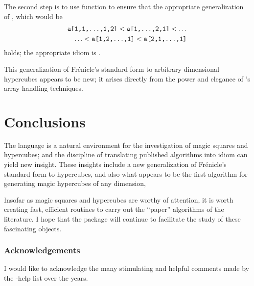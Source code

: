 \documentclass[nojss]{jss}
\begin{document}
The second step is to use function  to ensure that the
appropriate generalization of , which would be
\begin{eqnarray*}
\mbox{\texttt{a[1,1,...,1,2]}}<\mbox{\texttt{a[1,...,2,1]}}<\ldots\nonumber\\
\ldots<\mbox{\texttt{a[1,2,...,1]}}<\mbox{\texttt{a[2,1,...,1]}}
\end{eqnarray*}
holds; the appropriate  idiom is
.

This generalization of Fr\'{e}nicle's standard form to arbitrary
dimensional hypercubes appears to be new; it arises directly from the
power and elegance of 's array handling techniques.

\section{Conclusions}

The  language is a natural environment for the investigation of
magic squares and hypercubes; and the discipline of translating
published algorithms into  idiom can yield new insight.  These
insights include a new generalization of Fr\'{e}nicle's standard form
to hypercubes, and also what appears to be the first algorithm for
generating magic hypercubes of any dimension,

Insofar as magic squares and hypercubes are worthy of attention, it is
worth creating fast, efficient routines to carry out the ``paper''
algorithms of the literature.  I hope that the  package
will continue to facilitate the study of these fascinating objects.

\subsubsection*{Acknowledgements}
I would like to acknowledge the many stimulating and helpful comments
made by the -help list over the years.


\end{document}
